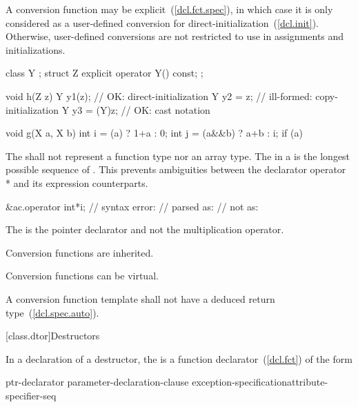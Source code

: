 \pnum
A conversion function may be explicit~(\ref{dcl.fct.spec}), in which case it is only considered as a user-defined conversion for direct-initialization~(\ref{dcl.init}). Otherwise, user-defined conversions are not restricted to use in assignments and initializations.
\enterexample

\begin{codeblock}
class Y { };
struct Z {
  explicit operator Y() const;
};

void h(Z z) {
  Y y1(z);          // OK: direct-initialization
  Y y2 = z;         // ill-formed: copy-initialization
  Y y3 = (Y)z;      // OK: cast notation
}

void g(X a, X b) {
  int i = (a) ? 1+a : 0;
  int j = (a&&b) ? a+b : i;
  if (a) {
  }
}
\end{codeblock}
\exitexample

\pnum
The
shall not represent a function type nor an array type.
The
in a
is the longest possible sequence of
.
\enternote
This prevents ambiguities between the declarator operator * and its expression
counterparts.
\enterexample

\begin{codeblock}
&ac.operator int*i; // syntax error:
                    // parsed as: 
                    // not as: 
\end{codeblock}

The \tcode{*} is the pointer declarator and not the multiplication operator.
\exitexample
\exitnote

\pnum
{}%
Conversion functions are inherited.

\pnum
{}%
Conversion functions can be virtual.

\pnum
{}%
A conversion function template shall not have a
deduced return type~(\ref{dcl.spec.auto}).

[class.dtor]{Destructors}%

\pnum
In a declaration of a destructor, the  is a
function declarator~(\ref{dcl.fct}) of the form

\begin{ncbnf}
ptr-declarator \terminal{(} parameter-declaration-clause \terminal{)} exception-specification\opt attribute-specifier-seq\opt
\end{ncbnf}

